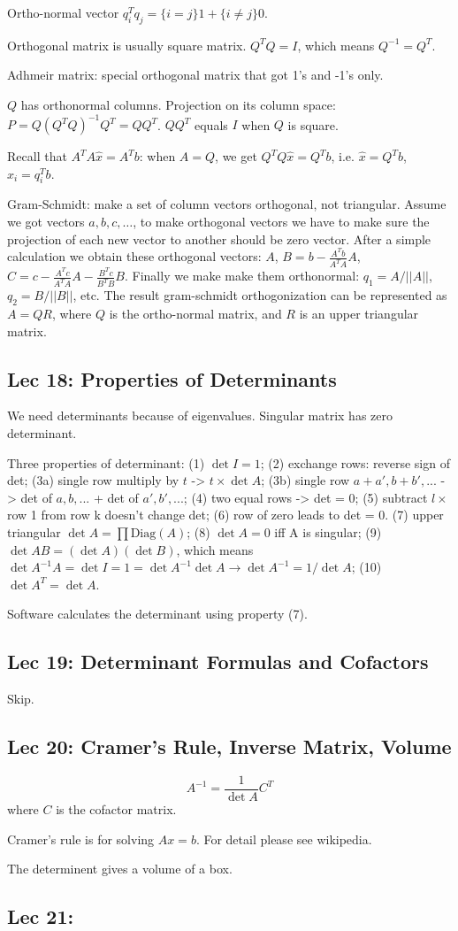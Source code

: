 Ortho-normal vector $ q_i^T q_j = \{i=j\} 1 + \{i\ne j\} 0 $.

Orthogonal matrix is usually square matrix. $Q^TQ=I$, which means $Q^{-1}=Q^T$.

Adhmeir matrix: special orthogonal matrix that got 1's and -1's only.

$Q$ has orthonormal columns. Projection on its column space: $P=Q(Q^TQ)^{-1}Q^T=QQ^T$.
$QQ^T$ equals $I$ when $Q$ is square.

Recall that $A^TA\hat{x}=A^Tb$: when $A=Q$, we get $Q^TQ\hat{x}=Q^Tb$, i.e.
$\hat{x}=Q^Tb$, $\hat{x}_i = q_i^T b$.

Gram-Schmidt: make a set of column vectors orthogonal, not triangular. Assume we got
vectors $a,b,c,\ldots$, to make orthogonal vectors we have to make sure the projection
of each new vector to another should be zero vector. After a simple calculation we obtain
these orthogonal vectors: $A$, $B=b-\frac{A^Tb}{A^TA}A$, $C=c-\frac{A^Tc}{A^TA}A - \frac{B^Tc}{B^TB} B$.
Finally we make make them orthonormal: $q_1 = A/||A||$, $q_2=B/||B||$, etc.
The result gram-schmidt orthogonization can be represented as $A=QR$, where $Q$ is the
ortho-normal matrix, and $R$ is an upper triangular matrix.

\subsection{Lec 18: Properties of Determinants}

We need determinants because of eigenvalues. Singular matrix has zero determinant.

Three properties of determinant: (1) $\det I = 1$; (2) exchange rows: reverse sign of det;
(3a) single row multiply by $t$ -> $t\times \det A$; (3b) single row $a+a',b+b',...$ -> det of $a,b,...$ + det of $a',b',...$;
(4) two equal rows -> det = 0; (5) subtract $l\times$ row 1 from row k doesn't change det;
(6) row of zero leads to det = 0. (7) upper triangular $\det A = \prod \text{Diag}(A)$;
(8) $\det A = 0$ iff A is singular; (9) $\det AB = (\det A)(\det B)$, which means
$\det A^{-1}A= \det I = 1 = \det A^{-1} \det A \rightarrow \det A^{-1} = 1/\det A$;
(10) $\det A^T=\det A$.

Software calculates the determinant using property (7).

\subsection{Lec 19: Determinant Formulas and Cofactors}

Skip.

\subsection{Lec 20: Cramer's Rule, Inverse Matrix, Volume}

$$A^{-1}=\frac{1}{\det A} C^T$$ where $C$ is the cofactor matrix.

Cramer's rule is for solving $Ax=b$. For detail please see wikipedia.

The determinent gives a volume of a box.

\subsection{Lec 21:}
